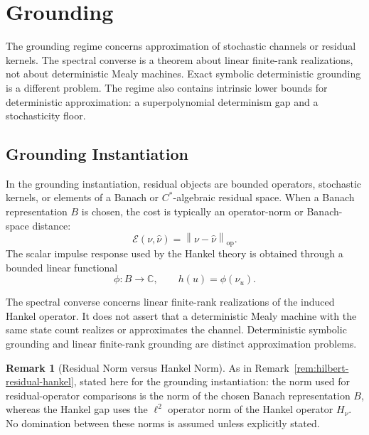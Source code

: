 \documentclass[12pt]{article}
\theoremstyle{definition}
\newtheorem{remark}[theorem]{Remark}
\newcommand{\norm}[1]{\left\lVert#1\right\rVert}
\begin{document}
\section{Grounding}
\label{sec:grounding}

The grounding regime concerns approximation of stochastic channels or residual
kernels.  The spectral converse is a theorem about linear finite-rank
realizations, not about deterministic Mealy machines.  Exact symbolic
deterministic grounding is a different problem.  The regime also contains
intrinsic lower bounds for deterministic approximation: a superpolynomial
determinism gap and a stochasticity floor.

\subsection{Grounding Instantiation}
\label{subsec:grounding-instantiation}

In the grounding instantiation, residual objects are bounded operators,
stochastic kernels, or elements of a Banach or $C^*$-algebraic residual space.
When a Banach representation $B$ is chosen, the cost is typically an
operator-norm or Banach-space distance:
\[
\mathcal E(\nu,\widehat\nu)
=
\norm{\nu-\widehat\nu}_{\mathrm{op}}.
\]
The scalar impulse response used by the Hankel theory is obtained through a
bounded linear functional
\[
\phi:B\to\mathbb C,
\qquad
h(u)=\phi(\nu_u).
\]

The spectral converse concerns linear finite-rank realizations of the induced
Hankel operator.  It does not assert that a deterministic Mealy machine with
the same state count realizes or approximates the channel.  Deterministic
symbolic grounding and linear finite-rank grounding are distinct approximation
problems.

\begin{remark}[Residual Norm versus Hankel Norm]
\label{rem:grounding-residual-hankel}
As in Remark~\ref{rem:hilbert-residual-hankel}, stated here for the grounding
instantiation: the norm used for residual-operator comparisons is the norm of
the chosen Banach representation $B$, whereas the Hankel gap uses the $\ell^2$
operator norm of the Hankel operator $H_\nu$.  No domination between these
norms is assumed unless explicitly stated.
\end{remark}
\end{document}
